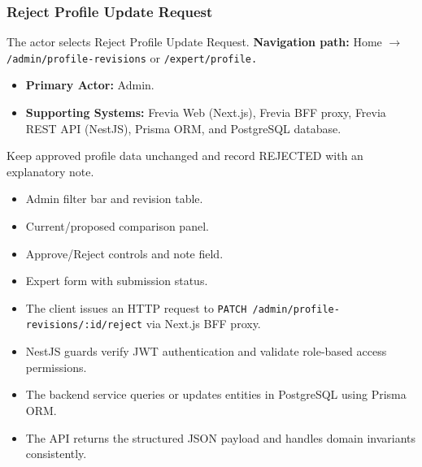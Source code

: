 \subsubsection{Reject Profile Update Request}

The actor selects Reject Profile Update Request.\newline
\textbf{Navigation path:} Home $\rightarrow$ \texttt{/\allowbreak{}admin/\allowbreak{}profile-\allowbreak{}revisions} or \texttt{/\allowbreak{}expert/\allowbreak{}profile.}


\begin{itemize}[leftmargin=1.6em,topsep=3pt,itemsep=2pt,parsep=0pt,label=$\bullet$]
    \item \textbf{Primary Actor:} Admin.
    \item \textbf{Supporting Systems:} Frevia Web (Next.js), Frevia BFF proxy, Frevia REST API (NestJS), Prisma ORM, and PostgreSQL database.
\end{itemize}

\noindent Keep approved profile data unchanged and record REJECTED with an explanatory note.

\begin{itemize}[leftmargin=1.6em,topsep=3pt,itemsep=2pt,parsep=0pt,label=$\bullet$]
    \item Admin filter bar and revision table.
    \item Current/proposed comparison panel.
    \item Approve/Reject controls and note field.
    \item Expert form with submission status.
\end{itemize}

\begin{itemize}[leftmargin=1.6em,topsep=3pt,itemsep=2pt,parsep=0pt,label=$\bullet$]
    \item The client issues an HTTP request to \texttt{PATCH /\allowbreak{}admin/\allowbreak{}profile-\allowbreak{}revisions/\allowbreak{}:\allowbreak{}id/\allowbreak{}reject} via Next.js BFF proxy.
    \item NestJS guards verify JWT authentication and validate role-based access permissions.
    \item The backend service queries or updates entities in PostgreSQL using Prisma ORM.
    \item The API returns the structured JSON payload and handles domain invariants consistently.
\end{itemize}

